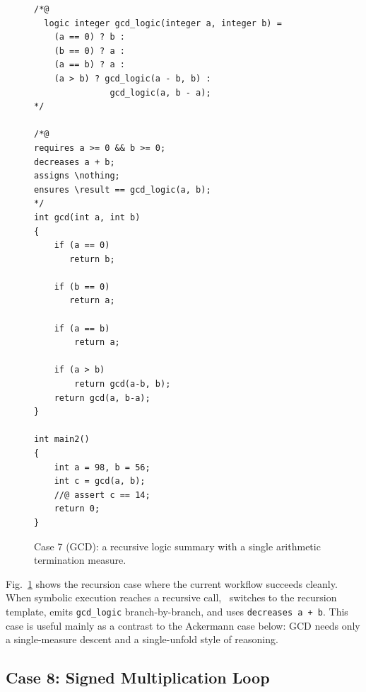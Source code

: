 \begin{figure}[!b]
    \centering
    \begin{tcolorbox}[casebox, title={Case 7: recursive GCD summary}]
\begin{lstlisting}[style=casecompactinnerstyle]
/*@ 
  logic integer gcd_logic(integer a, integer b) =
    (a == 0) ? b :
    (b == 0) ? a :
    (a == b) ? a :
    (a > b) ? gcd_logic(a - b, b) :
               gcd_logic(a, b - a);
*/

/*@
requires a >= 0 && b >= 0;
decreases a + b;
assigns \nothing;
ensures \result == gcd_logic(a, b);
*/
int gcd(int a, int b) 
{
    if (a == 0)
       return b;

    if (b == 0)
       return a;

    if (a == b)
        return a;

    if (a > b)
        return gcd(a-b, b);
    return gcd(a, b-a);
}

int main2()
{
    int a = 98, b = 56;
    int c = gcd(a, b);
    //@ assert c == 14;
    return 0;
}
\end{lstlisting}
    \end{tcolorbox}
    \caption{Case 7 (GCD): a recursive logic summary with a single arithmetic termination measure.}
    \label{fig:case5}
\end{figure}

Fig.~\ref{fig:case5} shows the recursion case where the current workflow succeeds cleanly. When symbolic execution reaches a recursive call, \toolname\ switches to the recursion template, emits \texttt{gcd\_logic} branch-by-branch, and uses \texttt{decreases a + b}. This case is useful mainly as a contrast to the Ackermann case below: GCD needs only a single-measure descent and a single-unfold style of reasoning.

\subsection{Case 8: Signed Multiplication Loop}
\label{app:case-mulloop}

